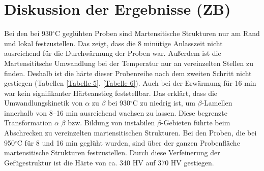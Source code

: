 \section{Diskussion der Ergebnisse (ZB)}

Bei den bei 930$^\circ$C geglühten Proben sind Martensitische Strukturen nur  am Rand und lokal festzustellen. Das zeigt, dass die 8 minütige Anlasszeit nicht ausreichend für die Durchwärmung der Proben war.
Außerdem ist die Martensititsche Umwandlung bei der Temperatur  nur an vereinzelten  Stellen zu finden. Deshalb ist die härte dieser Probenreihe nach dem zweiten Schritt nicht gestiegen (Tabellen \ref{Tabelle 5}, \ref{Tabelle 6}). Auch bei der Erwärmung für 16 min war kein signifikanter Härteanstieg feststellbar. Das erklärt, dass die Umwandlungskinetik von $\alpha$ zu $\beta$ bei 930$^\circ$C zu niedrig ist, um $\beta$-Lamellen innerhalb von 8--16 min ausreichend wachsen zu lassen. Diese begrenzte Transformation $\alpha$ $\beta$ bzw. Bildung von instabilen $\beta$-Gebieten führte beim Abschrecken zu vereinzelten martensitischen Strukturen.
Bei den Proben, die bei 950$^\circ$C für 8 und 16 min geglüht wurden, sind über der ganzen Probenfläche martensitische Strukturen festzustellen. Durch diese Verfeinerung der Gefügestruktur ist die Härte von ca. 340 HV auf 370 HV gestiegen. 

